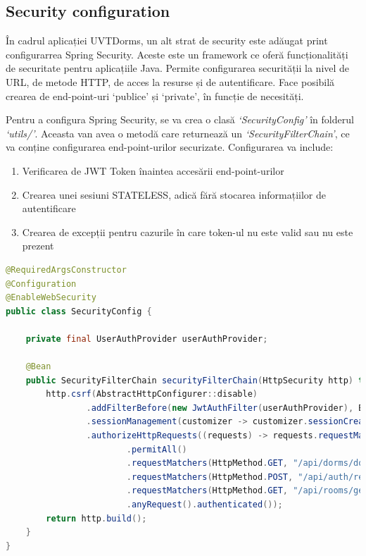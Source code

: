 \documentclass[12pt,a4paper]{report}
\theoremstyle{definition}
\theoremstyle{remark}
\begin{document}
\subsection{Security configuration}

\par În cadrul aplicației UVTDorms, un alt strat de security este adăugat print configurarrea Spring Security\cite{spilca2020spring}. Aceste este un framework ce oferă funcționalități de securitate pentru aplicațiile Java. Permite configurarea securității la nivel de URL, de metode HTTP, de acces la resurse și de autentificare. Face posibilă crearea de end-point-uri `publice' și `private', în funcție de necesități.

\par Pentru a configura Spring Security, se va crea o clasă \textit{`SecurityConfig'} în folderul \textit{`utils/'}. Aceasta van avea o metodă care returnează un \textit{`SecurityFilterChain'}, ce va conține configurarea end-point-urilor securizate. Configurarea va include:

\begin{enumerate}
    \item Verificarea de JWT Token înaintea accesării end-point-urilor
    \item Crearea unei sesiuni STATELESS, adică fără stocarea informațiilor de autentificare
    \item Crearea de excepții pentru cazurile în care token-ul nu este valid sau nu este prezent
\end{enumerate}

\begin{lstlisting}[language=Java, caption={Clasa prin care se realizează configurarea Spring Security}]
@RequiredArgsConstructor
@Configuration
@EnableWebSecurity
public class SecurityConfig {

    private final UserAuthProvider userAuthProvider;

    @Bean
    public SecurityFilterChain securityFilterChain(HttpSecurity http) throws Exception {
        http.csrf(AbstractHttpConfigurer::disable)
                .addFilterBefore(new JwtAuthFilter(userAuthProvider), BasicAuthenticationFilter.class)
                .sessionManagement(customizer -> customizer.sessionCreationPolicy(SessionCreationPolicy.STATELESS))
                .authorizeHttpRequests((requests) -> requests.requestMatchers(HttpMethod.POST, "/api/auth/login")
                        .permitAll()
                        .requestMatchers(HttpMethod.GET, "/api/dorms/dorms-names").permitAll()
                        .requestMatchers(HttpMethod.POST, "/api/auth/register-student").permitAll()
                        .requestMatchers(HttpMethod.GET, "/api/rooms/get-rooms-numbers-from-dorm/**").permitAll()
                        .anyRequest().authenticated());
        return http.build();
    }
}
\end{lstlisting}
\end{document}
